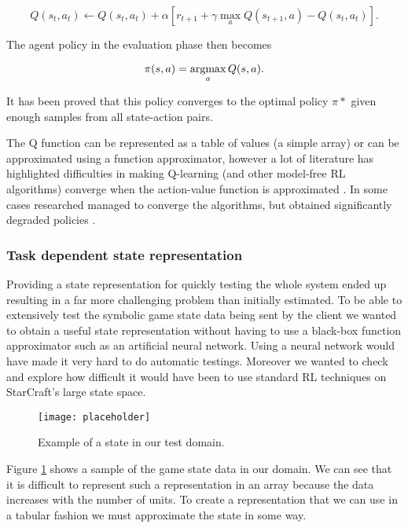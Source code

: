\begin{equation}
  Q(s_t, a_t) \leftarrow Q(s_t, a_t) +
  \alpha \left[ r_{t+1} + \gamma \max_a Q(s_{t+1}, a) - Q(s_t, a_t) \right].
\label{eq:ql}
\end{equation}

The agent policy in the evaluation phase then becomes

\begin{equation}
  \pi(s, a) = \operatornamewithlimits{argmax}_a Q(s, a).
\label{eq:ql2}
\end{equation}

It has been proved that this policy converges to the optimal policy $\pi*$ given
enough samples from all state-action pairs. %

The Q function can be represented as a table of values (a simple array) or can
be approximated using a function approximator, however a lot of literature has
highlighted difficulties in making Q-learning (and other model-free RL
algorithms) converge when the action-value function is approximated
\citep{Baird_1997}. In some cases researched managed to converge the algorithms,
but obtained significantly degraded policies \citep{bertsekas_1996_tetris,
  waver_and_baxter_1999, boyan_and_moore_1995}.

\subsubsection{Task dependent state representation}

Providing a state representation for quickly testing the whole system ended up
resulting in a far more challenging problem than initially estimated. To be able
to extensively test the symbolic game state data being sent by the client we
wanted to obtain a useful state representation without having to use a black-box
function approximator such as an artificial neural network. Using a neural
network would have made it very hard to do automatic testings. Moreover we
wanted to check and explore how difficult it would have been to use standard RL
techniques on StarCraft's large state space.

\begin{figure}[h]
    \centering
    \texttt{[image: placeholder]}
    \caption{Example of a state in our test domain.}
    \label{fig:sample_state}
\end{figure}

Figure \ref{fig:sample_state} shows a sample of the game state data in our
domain. We can see that it is difficult to represent such a representation in an
array because the data increases with the number of units. To create a
representation that we can use in a tabular fashion we must approximate the
state in some way.

